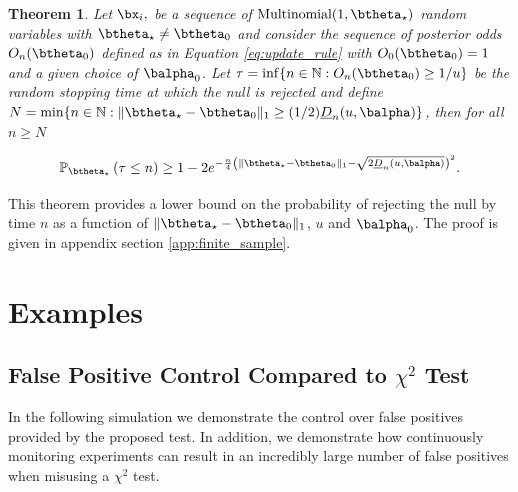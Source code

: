 \documentclass[11pt]{article}
\newtheorem{thm}{Theorem}[section]
\begin{document}
\begin{thm}
  \label{thm:finite_sample}
\noindent Let $\bx_i,$ be a sequence of $\text{Multinomial}(1,\btheta_{\star})$ random variables with $\btheta_{\star} \neq \btheta_0$ and consider the sequence of posterior odds $O_n(\btheta_0)$ defined as in Equation \eqref{eq:update_rule} with $O_0(\btheta_0)=1$ and a given choice of $\balpha_0$.
Let $\tau = \inf \lbrace n \in \mathbb{N}: O_n(\btheta_0) \geq 1/u \rbrace$ be the random stopping time at which the null is rejected and define $N = \min \{n \in \mathbb{N} : \|\btheta_\star - \btheta_0\|_1 \geq (1/2)\underline{D}_n(u,\balpha)\}$, then for all $n\geq N$

\begin{equation}
  \label{eq:finite_sample}
\mathbb{P}_{\btheta_{\star}}\left( \tau \leq  n \right) \geq
 1 -2e^{-\frac{n}{4}\left(\|\btheta_\star - \btheta_0\|_1-\sqrt{2\underline{D}_n(u,\balpha)}\right)^2}.
\end{equation}
\end{thm}
\noindent This theorem provides a lower bound on the probability of rejecting the null by time $n$ as a function of $\|\btheta_\star - \btheta_0\|_1$, $u$ and $\balpha_0$.
The proof is given in appendix section \ref{app:finite_sample}. 

\section{Examples}
\label{sec:simulation}
  \subsection{False Positive Control Compared to $\chi^2$ Test}
  In the following simulation we demonstrate the control over false positives provided by the proposed test.
  In addition, we demonstrate how continuously monitoring experiments can result in an incredibly large number of false positives when misusing a $\chi^2$ test.
\end{document}
